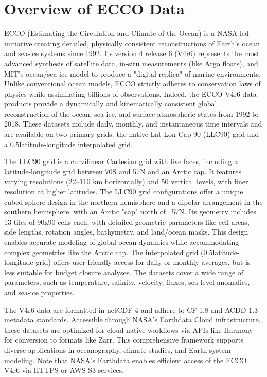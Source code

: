 \pagebreak
\section{Overview of ECCO Data}

\par\vspace{0.25cm}
ECCO (Estimating the Circulation and Climate of the Ocean) is a NASA-led initiative creating detailed, physically consistent reconstructions of Earth's ocean and sea-ice systems since 1992. Its version 4 release 6 (V4r6) represents the most advanced synthesis of satellite data, in-situ measurements (like Argo floats), and MIT's ocean/sea-ice model to produce a "digital replica" of marine environments. Unlike conventional ocean models, ECCO strictly adheres to conservation laws of physics while assimilating billions of observations. Indeed, the ECCO V4r6 data products provide a dynamically and kinematically consistent global reconstruction of the ocean, sea-ice, and surface atmospheric states from 1992 to 2018. These datasets include daily, monthly, and instantaneous time intervals and are available on two primary grids: the native Lat-Lon-Cap 90 (LLC90) grid and a 0.5\textdegree latitude-longitude interpolated grid. 

\par\vspace{0.25cm}
The LLC90 grid is a curvilinear Cartesian grid with five faces, including a latitude-longitude grid between 70\textdegree S and 57\textdegree N and an Arctic cap. It features varying resolutions (22–110 km horizontally) and 50 vertical levels, with finer resolution at higher latitudes. The LLC90 grid configurations offer a unique cubed-sphere design in the northern hemisphere and a dipolar arrangement in the southern hemisphere, with an Arctic "cap" north of ~57\textdegree N. Its geometry includes 13 tiles of 90x90 cells each, with detailed geometric parameters like cell areas, side lengths, rotation angles, bathymetry, and land/ocean masks. This design enables accurate modeling of global ocean dynamics while accommodating complex geometries like the Arctic cap.
The interpolated grid (0.5\textdegree latitude-longitude grid) offers user-friendly access for daily or monthly averages, but is less suitable for budget closure analyses. The datasets cover a wide range of parameters, such as temperature, salinity, velocity, fluxes, sea level anomalies, and sea-ice properties.

\par\vspace{0.25cm}
The V4r6 data are formatted in netCDF-4 and adhere to CF 1.8 and ACDD 1.3 metadata standards. Accessible through NASA's Earthdata Cloud infrastructure, these datasets are optimized for cloud-native workflows via APIs like Harmony for conversion to formats like Zarr. This comprehensive framework supports diverse applications in oceanography, climate studies, and Earth system modeling. Note that NASA's Earthdata enables efficient access of the ECCO V4r6 via HTTPS or AWS S3 services.

